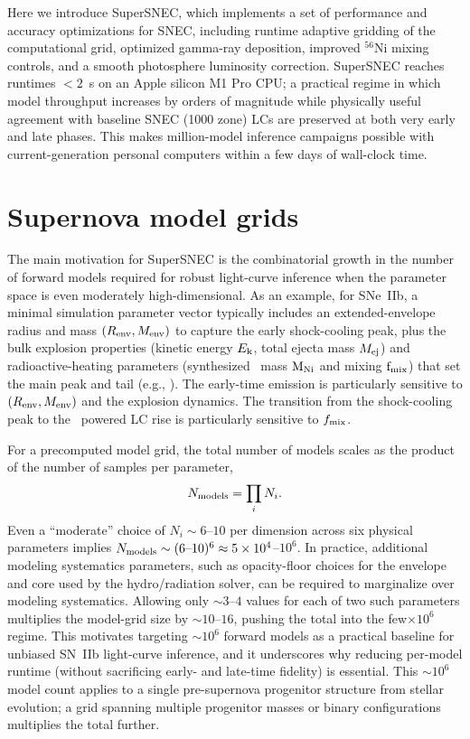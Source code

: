 \documentclass[twocolumn,linenumbers]{aastex701}
\begin{document}
Here we introduce SuperSNEC, which implements a set of performance and accuracy optimizations for SNEC, including runtime adaptive gridding of the computational grid, optimized gamma-ray deposition, improved $^{56}$Ni mixing controls, and a smooth photosphere luminosity correction. SuperSNEC reaches runtimes $<2$~s on an Apple silicon M1 Pro CPU; a practical regime in which model throughput increases by orders of magnitude while physically useful agreement with baseline SNEC (1000 zone) LCs are preserved at both very early and late phases. This makes million-model inference campaigns possible with current-generation personal computers within a few days of wall-clock time.


\section{Supernova model grids}
\label{sec:grid}

The main motivation for SuperSNEC is the combinatorial growth in the number of forward models required for robust light-curve inference when the parameter space is even moderately high-dimensional. As an example, for SNe~IIb, a minimal simulation parameter vector typically includes an extended-envelope radius and mass $(R_{\rm env},M_{\rm env})$ to capture the early shock-cooling peak, plus the bulk explosion properties (kinetic energy $E_{\rm k}$, total ejecta mass $M_{\rm ej}$) and radioactive-heating parameters (synthesized \Nif\ mass $\rm M_{Ni}$ and mixing $\rm f_{mix}$) that set the main peak and tail (e.g., \citealp{Bersten2012,MG2015}).  The early-time emission is particularly sensitive to $(R_{\rm env},M_{\rm env})$ and the explosion dynamics. The transition from the shock-cooling peak to the \Nif\ powered LC rise is particularly sensitive to $f_{\rm mix}$. %

For a precomputed model grid, the total number of models scales as the product of the number of samples per parameter,
\begin{equation}
N_{\rm models}=\prod_i N_i .
\end{equation}
Even a ``moderate'' choice of $N_i\sim6$--$10$ per dimension across six physical parameters implies $N_{\rm models}\sim(6\text{--}10)^6\approx5\times10^4$--$10^6$.  In practice, additional modeling systematics parameters, such as opacity-floor choices for the envelope and core used by the hydro/radiation solver, can be required to marginalize over modeling systematics. Allowing only $\sim3$--$4$ values for each of two such parameters multiplies the model-grid size by $\sim10$--$16$, pushing the total into the few$\times10^6$ regime. This motivates targeting $\sim10^6$ forward models as a practical baseline for unbiased SN~IIb light-curve inference, and it underscores why reducing per-model runtime (without sacrificing early- and late-time fidelity) is essential.  This ${\sim}10^6$ model count applies to a single pre-supernova progenitor structure from stellar evolution; a grid spanning multiple progenitor masses or binary configurations multiplies the total further.
 
\end{document}
